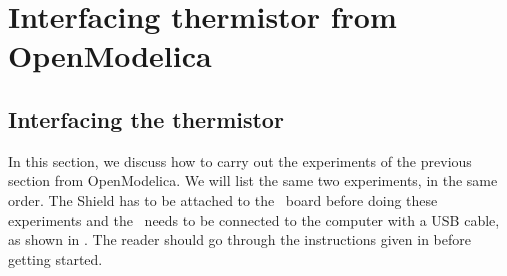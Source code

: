 \section{Interfacing thermistor from OpenModelica}
\subsection{Interfacing the thermistor}
In this section, we discuss how to carry out the experiments of the
previous section from OpenModelica.  We will list the same two experiments,
in the same order.  The Shield has to be attached to the \arduino\ board
before doing these experiments and the \arduino\ needs to be connected to the computer
with a USB cable, as shown in .
The reader should go through the instructions given in
 before getting started.


